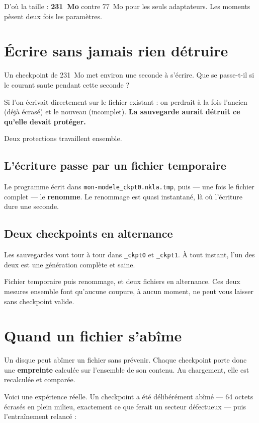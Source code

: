 D'où la taille : \textbf{231~Mo} contre 77~Mo pour les seuls adaptateurs. Les
moments pèsent deux fois les paramètres.

\section{Écrire sans jamais rien détruire}

Un checkpoint de 231~Mo met environ une seconde à s'écrire. Que se passe-t-il si
le courant saute pendant cette seconde ?

Si l'on écrivait directement sur le fichier existant : on perdrait à la fois
l'ancien (déjà écrasé) et le nouveau (incomplet). \textbf{La sauvegarde aurait
détruit ce qu'elle devait protéger.}

Deux protections travaillent ensemble.

\subsection{L'écriture passe par un fichier temporaire}

Le programme écrit dans \texttt{mon-modele\_ckpt0.nkla.tmp}, puis — une fois le
fichier complet — le \textbf{renomme}. Le renommage est quasi instantané,
là où l'écriture dure une seconde.

\subsection{Deux checkpoints en alternance}

Les sauvegardes vont tour à tour dans \texttt{\_ckpt0} et \texttt{\_ckpt1}. À
tout instant, l'un des deux est une génération complète et saine.

\begin{nkretenir}
Fichier temporaire puis renommage, et deux fichiers en alternance. Ces deux
mesures ensemble font qu'aucune coupure, à aucun moment, ne peut vous laisser
sans checkpoint valide.
\end{nkretenir}

\section{Quand un fichier s'abîme}

Un disque peut abîmer un fichier sans prévenir. Chaque checkpoint porte donc une
\textbf{empreinte} calculée sur l'ensemble de son contenu. Au chargement, elle
est recalculée et comparée.

Voici une expérience réelle. Un checkpoint a été délibérément abîmé — 64 octets
écrasés en plein milieu, exactement ce que ferait un secteur défectueux — puis
l'entraînement relancé :


